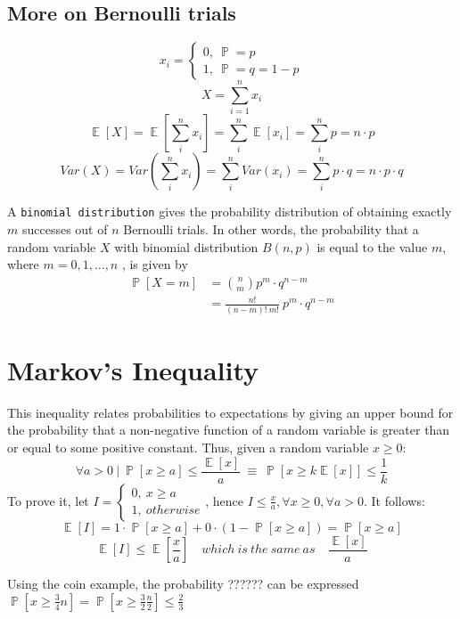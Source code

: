 \documentclass[twoside]{article}
\DeclareMathOperator{\E}{\mathbb{E}}
\DeclareMathOperator{\Prob}{\mathbb{P}}
\begin{document}
\subsection{More on Bernoulli trials}

\[x_i = \begin{cases} 0,\:\Prob = p \\ 1,\:\Prob=q=1-p \end{cases} \]
\[X = \sum_{i=1}^{n} x_i\]
\[\E[X]=\E[\sum_{i}^{n}x_i]	=\sum_{i}^{n}\E[x_i] = \sum_{i}^{n}p = n\cdot p \]
\[Var(X)=Var(\sum_{i}^{n}x_i)=\sum_{i}^{n}Var(x_i) = \sum_{i}^{n}p\cdot q = n\cdot p\cdot q \]

A {\tt binomial distribution} gives the probability distribution of obtaining exactly $m$ successes out of $n$ Bernoulli trials. In other words, the probability that a random variable $X$ with binomial distribution $B(n,p)$ is equal to the value $m$, where $m = 0, 1,\ldots,n$ , is given by 
\begin{align*} 
\Prob[X=m]&= {{n}\choose{m}} p^m \cdot q^{n-m} \\
&= \frac{n!}{(n-m)!\:m!}\: p^m \cdot q^{n-m}
\end{align*} 

\section{Markov's Inequality}
This inequality relates probabilities to expectations by giving an upper bound for the probability that a non-negative function of a random variable is greater than or equal to some positive constant. Thus, given a random variable $x \geq 0:$
\[\forall a>0\:|\:\Prob[x \geq a] \leq \frac{\E[x]}{a} \:\equiv\:
  \Prob[x \geq k\E[x]]  \leq \frac{1}{k}\]
To prove it, let $I = \begin{cases} 0,\: x \geq a \\ 1,\:otherwise \end{cases}$, hence $I \leq \frac{x}{a},\forall x \geq 0, \forall a > 0$. It follows:
\[\E[I] = 1 \cdot \Prob[x \geq a] + 0  \cdot (1-\Prob[x \geq a]) = \Prob[x \geq a]\]
\[\E[I]\leq \E[\frac{x}{a}]\quad which\: is\: the\: same\: as\quad \frac{\E[x]}{a} \]

Using the coin example, the probability ?????? can be expressed $\Prob[x\geq \frac{3}{4}n]=\Prob[x\geq \frac{3}{2}\frac{n}{2}]\leq \frac{2}{3}$
\end{document}
